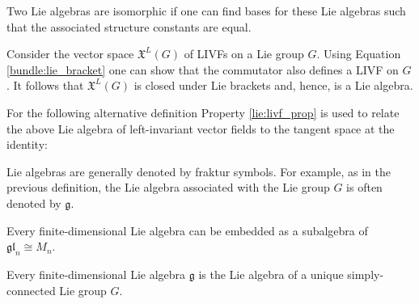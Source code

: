     \begin{property}[Isomorphism]
        Two Lie algebras are isomorphic if one can find bases for these Lie algebras such that the associated structure constants are equal.
    \end{property}

    \begin{example}
        Consider the vector space $\mathfrak{X}^L(G)$ of LIVFs on a Lie group $G$. Using Equation \eqref{bundle:lie_bracket} one can show that the commutator also defines a LIVF on $G$. It follows that $\mathfrak{X}^L(G)$ is closed under Lie brackets and, hence, is a Lie algebra.
    \end{example}
    For the following alternative definition Property \ref{lie:livf_prop} is used to relate the above Lie algebra of left-invariant vector fields to the tangent space at the identity:
    \begin{notation}
        Lie algebras are generally denoted by fraktur symbols. For example, as in the previous definition, the Lie algebra associated with the Lie group $G$ is often denoted by $\mathfrak{g}$.
    \end{notation}

    \begin{theorem}[Ado]\label{lie:ado}
        Every finite-dimensional Lie algebra can be embedded as a subalgebra of $\mathfrak{gl}_n\cong M_n$.
    \end{theorem}
    \begin{theorem}
        Every finite-dimensional Lie algebra $\mathfrak{g}$ is the Lie algebra of a unique simply-connected Lie group $G$.
    \end{theorem}

